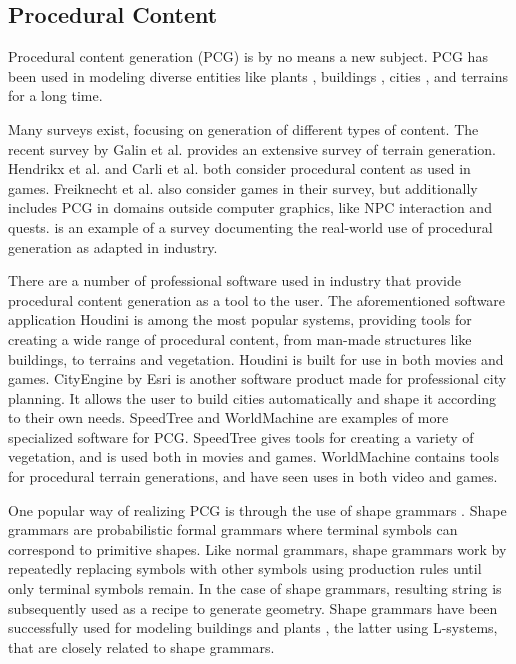 \documentclass[english]{article}
\begin{document}
\subsection{Procedural Content}

Procedural content generation (PCG) is by no means a new subject. PCG has been used in modeling diverse entities like plants \cite{plant_l_system}, buildings \cite{building_shape_grammar}, cities \cite{procedural_city_modeling}, and terrains \cite{early_terrain_generation} for a long time. 

Many surveys exist, focusing on generation of different types of content. The recent survey by Galin et al. \cite{terrain_survey_2019} provides an extensive survey of terrain generation. Hendrikx et al. \cite{pcg_survey_2013} and Carli et al. \cite{brazilian_pcg_survey} both consider procedural content as used in games. Freiknecht et al. \cite{pcg_survey_2017} also consider games in their survey, but additionally includes PCG in domains outside computer graphics, like NPC interaction and quests. \cite{amato2017} is an example of a survey documenting the real-world use of procedural generation as adapted in industry.

There are a number of professional software used in industry that provide procedural content generation as a tool to the user. The aforementioned software application Houdini \cite{houdini} is among the most popular systems, providing tools for creating a wide range of procedural content, from man-made structures like buildings, to terrains and vegetation. Houdini is built for use in both movies and games. CityEngine \cite{cityengine} by Esri is another software product made for professional city planning. It allows the user to build cities automatically and shape it according to their own needs. SpeedTree \cite{speedtree} and WorldMachine \cite{worldmachine} are examples of more specialized software for PCG. SpeedTree gives tools for creating a variety of vegetation, and is used both in movies and games. WorldMachine contains tools for procedural terrain generations, and have seen uses in both video and games.

One popular way of realizing PCG is through the use of shape grammars \cite{stiny2006shape}. Shape grammars are probabilistic formal grammars where terminal symbols can correspond to primitive shapes. Like normal grammars, shape grammars work by repeatedly replacing symbols with other symbols using production rules until only terminal symbols remain. In the case of shape grammars, resulting string is subsequently used as a recipe to generate geometry. Shape grammars have been successfully used for modeling buildings \cite{building_shape_grammar} and plants \cite{plant_l_system}, the latter using L-systems, that are closely related to shape grammars.
\end{document}
